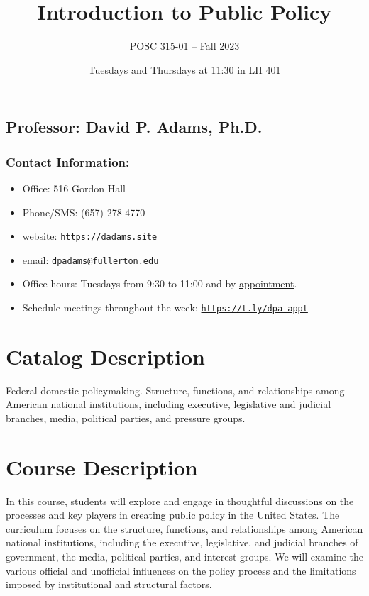 \documentclass[12pt, letterpaper]{article}
\begin{document}
\title{Introduction to Public Policy}
\author{POSC 315-01 -- Fall 2023}
\date{ Tuesdays and Thursdays at 11:30 in LH 401}

    \maketitle


\subsection*{Professor: David P. Adams, Ph.D.}

\subsubsection*{Contact Information:}

\begin{itemize}
	\item Office: 516 Gordon Hall
	\item Phone/SMS: (657) 278-4770
	\item website: \href{https://dadams.site}{\texttt{https://dadams.site}}
	\item email: \href{dpadams@fullerton.edu}{\texttt{dpadams@fullerton.edu}}
	\item Office hours: Tuesdays from 9:30 to 11:00 and by \href{https://t.ly/dpa-appt}{appointment}.
	\item Schedule meetings throughout the week: \href{https://t.ly/dpa-appt}{\texttt{https://t.ly/dpa-appt}}
\end{itemize}


\section*{Catalog Description}

	Federal domestic policymaking. Structure, functions, and relationships among American national institutions, including executive, legislative and judicial branches, media, political parties, and pressure groups.

\section*{Course Description}

	In this course, students will explore and engage in thoughtful discussions on the processes and key players in creating public policy in the United States. The curriculum focuses on the structure, functions, and relationships among American national institutions, including the executive, legislative, and judicial branches of government, the media, political parties, and interest groups. We will examine the various official and unofficial influences on the policy process and the limitations imposed by institutional and structural factors.
\end{document}

